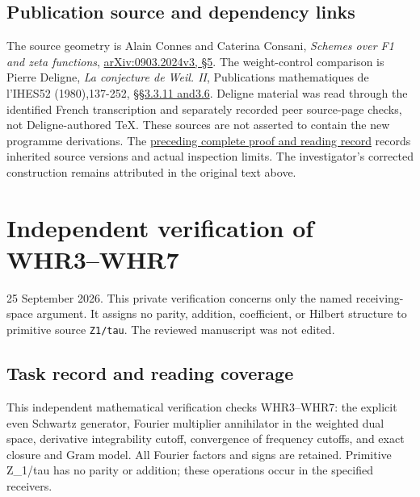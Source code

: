 \section{Publication source and dependency
links}\label{publication-source-and-dependency-links-21}

The source geometry is Alain Connes and Caterina Consani, \emph{Schemes
over F1 and zeta functions},
\href{https://arxiv.org/abs/0903.2024v3}{arXiv:0903.2024v3, §5}. The
weight-control comparison is Pierre Deligne, \emph{La conjecture de
Weil. II}, Publications mathematiques de l'IHES52 (1980),137-252,
\href{https://www.numdam.org/item/PMIHES_1980__52__137_0/}{§§3.3.11
and3.6}. Deligne material was read through the identified French
transcription and separately recorded peer source-page checks, not
Deligne-authored TeX. These sources are not asserted to contain the new
programme derivations. The
\href{https://github.com/KokunoYumeto/zeta-function-research-reader/blob/36a82ecca98addb8a98b48204e349737856c7223/workbenches/splitzero-tandem/continuations/20260924-cohomology-weight-and-character-lifts/BUILD_AND_REVIEW.md}{preceding
complete proof and reading record} records inherited source versions and
actual inspection limits. The investigator's corrected construction
remains attributed in the original text above.

\chapter{Independent verification of
WHR3--WHR7}\label{independent-verification-of-whr3whr7}

25 September 2026. This private verification concerns only the named
receiving-space argument. It assigns no parity, addition, coefficient,
or Hilbert structure to primitive source \texttt{Z1/tau}. The reviewed
manuscript was not edited.

\section{Task record and reading
coverage}\label{task-record-and-reading-coverage}

This independent mathematical verification checks WHR3--WHR7: the
explicit even Schwartz generator, Fourier multiplier annihilator in the
weighted dual space, derivative integrability cutoff, convergence of
frequency cutoffs, and exact closure and Gram model. All Fourier factors
and signs are retained. Primitive Z\_1/tau has no parity or addition;
these operations occur in the specified receivers.

